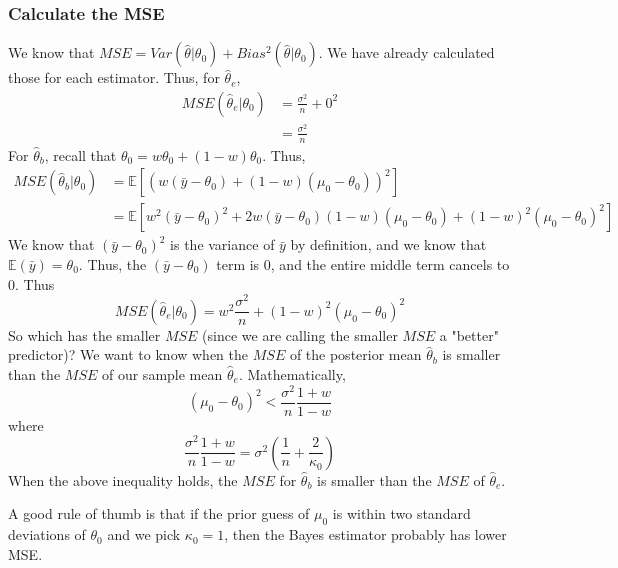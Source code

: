 \documentclass[titlepage, 12pt, leqno]{article}
\begin{document}
\subsubsection{Calculate the MSE}
We know that $MSE = Var(\hat \theta|\theta_{0}) + Bias^{2}(\hat \theta|\theta_{0})$. We
have already calculated those for each estimator. Thus, for $\hat \theta_{e}$,
\begin{align*}
    MSE(\hat \theta_{e}|\theta_{0}) &= \frac{\sigma^{2}}{n} + 0^{2}\\
                                    &= \frac{\sigma^{2}}{n}
\end{align*}
For $\hat \theta_{b}$, recall that $\theta_{0}=w\theta_{0}+(1-w)\theta_{0}$. Thus,
\begin{align*}
    MSE(\hat \theta_{b}|\theta_{0}) &= \mathbb{E}[(w(\bar y-\theta_{0})+(1-w)(\mu_{0}-
    \theta_{0}))^{2}]\\
                                    &= \mathbb{E}[w^{2}(\bar y-\theta_{0})^{2}+ 2w
                                    (\bar y-\theta_{0})(1-w)(\mu_{0}-\theta_{0}) +
                                    (1-w)^{2}(\mu_{0}-\theta_{0})^{2}]
\end{align*}
We know that $(\bar y-\theta_{0})^{2}$ is the variance of $\bar y$ by definition, and we
know that $ \mathbb{E}(\bar y)=\theta_{0}$. Thus, the $(\bar y-\theta_{0})$ term is
0, and the entire middle term cancels to 0. Thus
\[
    \boxed{MSE(\hat \theta_{e}|\theta_{0}) = w^{2}\frac{\sigma^{2}}{n}+
    (1-w)^{2}(\mu_{0}-\theta_{0})^{2}}
\]
So which has the smaller $MSE$ (since we are calling the smaller $MSE$ a "better"
predictor)? We want to know when the $MSE$ of the posterior mean $\hat \theta_{b}$ is 
smaller than the $MSE$ of our sample mean $\hat \theta_{e}$. Mathematically,
\[
    (\mu_{0}-\theta_{0})^{2} < \frac{\sigma^{2}}{n}\frac{1+w}{1-w}
\]
where
\[
\frac{\sigma^{2}}{n}\frac{1+w}{1-w} = \sigma^{2}\left(\frac{1}{n}+\frac{2}{\kappa_{0}}
    \right)
\]
When the above inequality holds, the $MSE$ for $\hat \theta_{b}$ is smaller than
the $MSE$ of $\hat \theta_{e}$.

\begin{note}
    A good rule of thumb is that if the prior guess of $\mu_{0}$ is within two standard
    deviations of $\theta_{0}$ and we pick $\kappa_{0}=1$, then the Bayes estimator
    probably has lower MSE.
\end{note}
\end{document}
